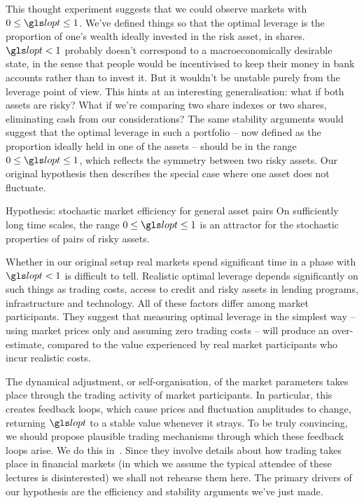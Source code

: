 This thought experiment suggests that we could observe markets with $0\leq\lopt\leq1$. We've defined things so that the optimal leverage is the proportion of one's wealth ideally invested in the risk asset, \ie in shares. $\lopt<1$ probably doesn't correspond to a macroeconomically desirable state, in the sense that people would be incentivised to keep their money in bank accounts rather than to invest it. But it wouldn't be unstable purely from the leverage point of view. This hints at an interesting generalisation: what if both assets are risky? What if we're comparing two share indexes or two shares, eliminating cash from our considerations? The same stability arguments would suggest that the optimal leverage in such a portfolio -- now defined as the proportion ideally held in one of the assets -- should be in the range $0\leq\lopt\leq1$, which reflects the symmetry between two risky assets. Our original hypothesis then describes the special case where one asset does not fluctuate.

\begin{keypts}{Hypothesis: stochastic market efficiency for general asset pairs}
On sufficiently long time scales, the range $0\leq\lopt\leq1$ is an attractor for the stochastic properties of pairs of risky assets. 
\end{keypts}

Whether in our original setup real markets spend significant time in a phase with $\lopt<1$ is difficult to tell. Realistic optimal leverage depends significantly on such things as trading costs, access to credit and risky assets in lending programs, infrastructure and technology. All of these factors differ among market participants. They suggest that measuring optimal leverage in the simplest way -- using market prices only and assuming zero trading costs -- will produce an over-estimate, compared to the value experienced by real market participants who incur realistic costs.

The dynamical adjustment, or self-organisation, of the market parameters takes place through the trading activity of market participants. In particular, this creates feedback loops, which cause prices and fluctuation amplitudes to change, returning $\lopt$ to a stable value whenever it strays. To be truly convincing, we should propose plausible trading mechanisms through which these feedback loops arise. We do this in~\cite{PetersAdamou2013}. Since they involve details about how trading takes place in financial markets (in which we assume the typical attendee of these lectures is disinterested) we shall not rehearse them here. The primary drivers of our hypothesis are the efficiency and stability arguments we've just made.

